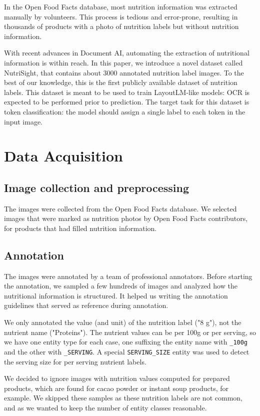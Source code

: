 \documentclass{article}
\begin{document}
In the Open Food Facts database, most nutrition information was extracted manually by volunteers. This process is tedious and error-prone, resulting in thousands of products with a photo of nutrition labels but without nutrition information.

With recent advances in Document AI, automating the extraction of nutritional information is within reach. In this paper, we introduce a novel dataset called NutriSight, that contains about 3000 annotated nutrition label images. To the best of our knowledge, this is the first publicly available dataset of nutrition labels.
This dataset is meant to be used to train LayoutLM-like models: OCR is expected to be performed prior to prediction. The target task for this dataset is token classification: the model should assign a single label to each token in the input image.

\section{Data Acquisition}

\subsection{Image collection and preprocessing}

The images were collected from the Open Food Facts database. We selected images that were marked as nutrition photos by Open Food Facts contributors, for products that had filled nutrition information.

\subsection{Annotation}

The images were annotated by a team of professional annotators. Before starting the annotation, we sampled a few hundreds of images and analyzed how the nutritional information is structured. It helped us writing the annotation guidelines that served as reference during annotation.

We only annotated the value (and unit) of the nutrition label ("8 g"), not the nutrient name ("Proteins"). The nutrient values can be per 100g or per serving, so we have one entity type for each case, one suffixing the entity name with \verb+_100g+ and the other with \verb+_SERVING+. A special \verb+SERVING_SIZE+ entity was used to detect the serving size for per serving nutrient labels.

We decided to ignore images with nutrition values computed for prepared products, which are found for cacao powder or instant soup products, for example. We skipped these samples as these nutrition labels are not common, and as we wanted to keep the number of entity classes reasonable.
\end{document}
